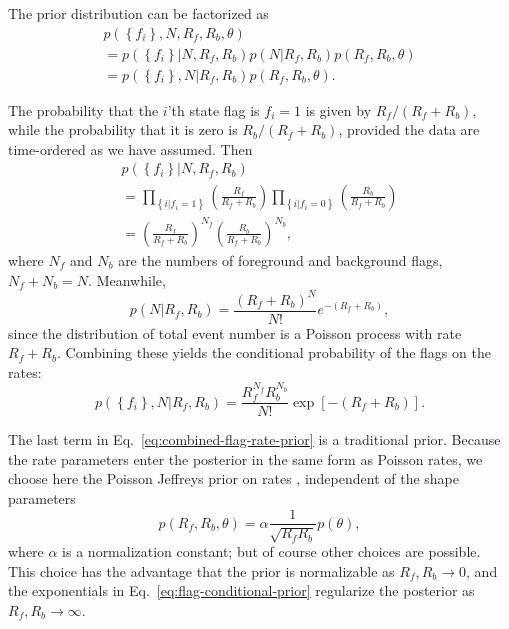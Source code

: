 \documentclass[aps,prd,reprint,nofootinbib]{revtex4-1}
\newcommand{\mathset}[1]{\left\{ #1 \right\}}
\begin{document}
The prior distribution can be factorized as
\begin{multline}
  \label{eq:combined-flag-rate-prior}
  p\left(\mathset{f_i}, N, R_f, R_b, \theta\right) \\ = p\left(
  \mathset{f_i} | N, R_f, R_b\right) p\left(N |R_f, R_b\right)
  p\left(R_f, R_b, \theta\right) \\ = p\left( \mathset{f_i},N | R_f,
  R_b\right) p\left(R_f, R_b, \theta\right).
 \end{multline}
 
The probability that the $i$'th state flag is $f_i=1$ is given by
$R_f/(R_f+R_b)$, while the probability that it is zero is
$R_b/(R_f+R_b)$, provided the data are time-ordered as we have
assumed.  Then
\begin{multline}
p\left( \mathset{f_i} | N, R_f, R_b\right) \\ = \prod_{\mathset{i|f_i=1}}
\left(\frac{R_f}{R_f+R_b}\right) \prod_{\mathset{i|f_i=0}}
\left(\frac{R_b}{R_f+R_b}\right) \\ =
\left(\frac{R_f}{R_f+R_b}\right)^{N_f}
\left(\frac{R_b}{R_f+R_b}\right)^{N_b},
\end{multline}
where $N_f$ and $N_b$ are the numbers of foreground and background
flags, $N_f+N_b=N$.  Meanwhile,
\begin{equation}
p\left(N |R_f, R_b\right) = \frac{\left(R_f+R_b\right)^N}{N!}
e^{-(R_f+R_b)},
\end{equation}
since the distribution of total event number is a Poisson process with
rate $R_f+R_b$.  Combining these yields the conditional probability of
the flags on the rates:
\begin{equation}
  \label{eq:flag-conditional-prior}
  p\left(\mathset{f_i},N | R_f, R_b\right) = \frac{R_f^{N_f}
    R_b^{N_b}}{N!} \exp\left[ - \left(R_f + R_b\right) \right].
\end{equation} 


The last term in Eq.~\eqref{eq:combined-flag-rate-prior} is a
traditional prior.  Because the rate parameters enter the posterior in
the same form as Poisson rates, we choose here the Poisson Jeffreys
prior on rates \citep{Jeffreys1946}, independent of the shape
parameters
\begin{equation}
  p\left( R_f, R_b, \theta\right) = \alpha \frac{1}{\sqrt{R_f R_b}}
  p(\theta),
\end{equation}
where $\alpha$ is a normalization constant; but of course other
choices are possible.  This choice has the advantage that the prior is
normalizable as $R_f, R_b \to 0$, and the exponentials in
Eq.~\eqref{eq:flag-conditional-prior} regularize the posterior as
$R_f, R_b \to \infty$.
\end{document}
